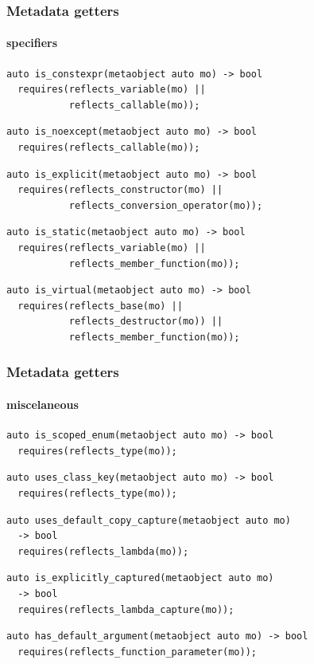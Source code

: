 \documentclass[compress,table,xcolor=table]{beamer}
\begin{document}
\begin{frame}[fragile]
  \frametitle{Metadata getters}
  \framesubtitle{specifiers}
  \begin{lstlisting}[language=c++2x,basicstyle=\footnotesize\ttfamily]
auto is_constexpr(metaobject auto mo) -> bool
  requires(reflects_variable(mo) ||
           reflects_callable(mo));
  \end{lstlisting}
  \vfill
  \begin{lstlisting}[language=c++2x,basicstyle=\footnotesize\ttfamily]
auto is_noexcept(metaobject auto mo) -> bool
  requires(reflects_callable(mo));
  \end{lstlisting}
  \vfill
  \begin{lstlisting}[language=c++2x,basicstyle=\footnotesize\ttfamily]
auto is_explicit(metaobject auto mo) -> bool
  requires(reflects_constructor(mo) ||
           reflects_conversion_operator(mo));
  \end{lstlisting}
  \vfill
  \begin{lstlisting}[language=c++2x,basicstyle=\footnotesize\ttfamily]
auto is_static(metaobject auto mo) -> bool
  requires(reflects_variable(mo) ||
           reflects_member_function(mo));
  \end{lstlisting}
  \vfill
  \begin{lstlisting}[language=c++2x,basicstyle=\footnotesize\ttfamily]
auto is_virtual(metaobject auto mo) -> bool
  requires(reflects_base(mo) ||
           reflects_destructor(mo)) ||
           reflects_member_function(mo));
  \end{lstlisting}
\end{frame}
\begin{frame}[fragile]
  \frametitle{Metadata getters}
  \framesubtitle{miscelaneous}
  \begin{lstlisting}[language=c++2x,basicstyle=\scriptsize\ttfamily]
auto is_scoped_enum(metaobject auto mo) -> bool
  requires(reflects_type(mo));
  \end{lstlisting}
  \vfill
  \begin{lstlisting}[language=c++2x,basicstyle=\footnotesize\ttfamily]
auto uses_class_key(metaobject auto mo) -> bool
  requires(reflects_type(mo));
  \end{lstlisting}
  \vfill
  \begin{lstlisting}[language=c++2x,basicstyle=\footnotesize\ttfamily]
auto uses_default_copy_capture(metaobject auto mo)
  -> bool
  requires(reflects_lambda(mo));
  \end{lstlisting}
  \vfill
  \begin{lstlisting}[language=c++2x,basicstyle=\footnotesize\ttfamily]
auto is_explicitly_captured(metaobject auto mo)
  -> bool
  requires(reflects_lambda_capture(mo));
  \end{lstlisting}
  \vfill
  \begin{lstlisting}[language=c++2x,basicstyle=\footnotesize\ttfamily]
auto has_default_argument(metaobject auto mo) -> bool
  requires(reflects_function_parameter(mo));
  \end{lstlisting}
\end{frame}
\end{document}
